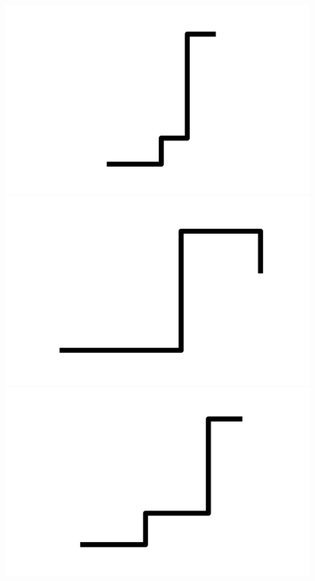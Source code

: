 \documentclass[]{report}
\begin{document}
\includegraphics[scale=.1]{pictures/21/state_cluster_shapes_304.pdf} 
\includegraphics[scale=.1]{pictures/21/state_cluster_shapes_305.pdf} 
\includegraphics[scale=.1]{pictures/21/state_cluster_shapes_306.pdf} 
\end{document}
